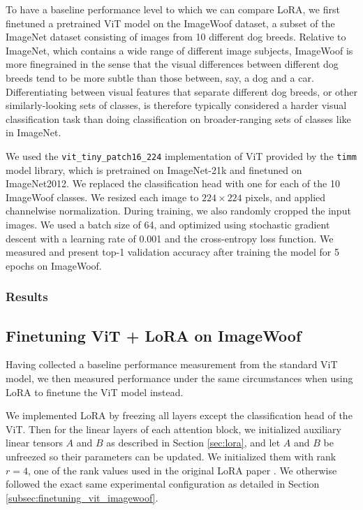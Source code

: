 \documentclass[10pt]{article}
\begin{document}
To have a baseline performance level to which we can compare LoRA, we first finetuned a pretrained ViT \cite{dosovitskiy2021imageworth16x16words} model on the ImageWoof dataset, a subset of the ImageNet \cite{deng2009imagenet} dataset consisting of images from 10 different dog breeds. Relative to ImageNet, which contains a wide range of different image subjects, ImageWoof is more finegrained in the sense that the visual differences between different dog breeds tend to be more subtle than those between, say, a dog and a car. Differentiating between visual features that separate different dog breeds, or other similarly-looking sets of classes, is therefore typically considered a harder visual classification task than doing classification on broader-ranging sets of classes like in ImageNet.

We used the \verb|vit_tiny_patch16_224| implementation of ViT provided by the \verb|timm| \cite{rw2019timm} model library, which is pretrained on ImageNet-21k and finetuned on ImageNet2012. We replaced the classification head with one for each of the 10 ImageWoof classes. We resized each image to $224 \times 224$ pixels, and applied channelwise normalization. During training, we also randomly cropped the input images. We used a batch size of 64, and optimized using stochastic gradient descent with a learning rate of 0.001 and the cross-entropy loss function. We measured and present top-1 validation accuracy after training the model for 5 epochs on ImageWoof.

\subsubsection{Results}


\subsection{Finetuning ViT + LoRA on ImageWoof}

Having collected a baseline performance measurement from the standard ViT model, we then measured performance under the same circumstances when using LoRA to finetune the ViT model instead.

We implemented LoRA by freezing all layers except the classification head of the ViT. Then for the linear layers of each attention block, we initialized auxiliary linear tensors $A$ and $B$ as described in Section \ref{sec:lora}, and let $A$ and $B$ be unfreezed so their parameters can be updated. We initialized them with rank $r = 4$, one of the rank values used in the original LoRA paper \cite{hu2021loralowrankadaptationlarge}. We otherwise followed the exact same experimental configuration as detailed in Section \ref{subsec:finetuning_vit_imagewoof}.
\end{document}
